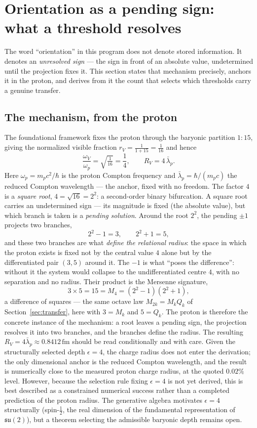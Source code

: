 \documentclass[11pt,a4paper]{article}
\begin{document}
\section{Orientation as a pending sign: what a threshold resolves}\label{sec:selector}

The word ``orientation'' in this program does not denote stored information. It denotes an \emph{unresolved sign} --- the sign in front of an absolute value, undetermined until the projection fixes it. This section states that mechanism precisely, anchors it in the proton, and derives from it the count that selects which thresholds carry a genuine transfer.

\subsection{The mechanism, from the proton}
The foundational framework fixes the proton through the baryonic partition $1:15$, giving the normalized visible fraction $r_V=\tfrac{1}{1+15}=\tfrac{1}{16}$ and hence
\[
\frac{\omega_V}{\omega_p}=\sqrt{\tfrac{1}{16}}=\frac14,\qquad R_V=4\,\bar\lambda_p .
\]
Here $\omega_p=m_pc^2/\hbar$ is the proton Compton frequency and $\bar\lambda_p=\hbar/(m_pc)$ the reduced Compton wavelength --- the anchor, fixed with no freedom. The factor $4$ is a \emph{square root}, $4=\sqrt{16}=2^2$: a second-order binary bifurcation. A square root carries an undetermined sign --- its magnitude is fixed (the absolute value), but which branch is taken is a \emph{pending solution}. Around the root $2^2$, the pending $\pm1$ projects two branches,
\[
2^2-1=3,\qquad 2^2+1=5,
\]
and these two branches are what \emph{define the relational radius}: the space in which the proton exists is fixed not by the central value $4$ alone but by the differentiated pair $(3,5)$ around it. The $-1$ is what ``poses the difference'': without it the system would collapse to the undifferentiated centre $4$, with no separation and no radius. Their product is the Mersenne signature,
\[
3\times5=15=M_4=(2^2-1)(2^2+1),
\]
a difference of squares --- the same octave law $M_{2k}=M_kQ_k$ of Section~\ref{sec:transfer}, here with $3=M_k$ and $5=Q_k$. The proton is therefore the concrete instance of the mechanism: a root leaves a pending sign, the projection resolves it into two branches, and the branches define the radius. The resulting $R_V=4\bar\lambda_p\approx0.8412\,\mathrm{fm}$ should be read conditionally and with care. Given the structurally selected depth $\epsilon=4$, the charge radius does not enter the derivation; the only dimensional anchor is the reduced Compton wavelength, and the result is numerically close to the measured proton charge radius, at the quoted $0.02\%$ level. However, because the selection rule fixing $\epsilon=4$ is not yet derived, this is best described as a constrained numerical success rather than a completed prediction of the proton radius. The generative algebra motivates $\epsilon=4$ structurally (spin-$\tfrac12$, the real dimension of the fundamental representation of $\mathfrak{su}(2)$), but a theorem selecting the admissible baryonic depth remains open.
\end{document}
